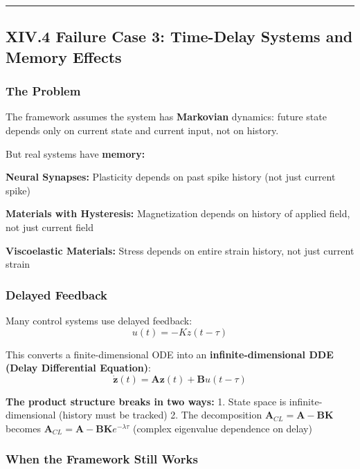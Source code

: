 \documentclass[
]{article}
\begin{document}
\begin{center}\rule{0.5\linewidth}{0.5pt}\end{center}

\subsection{XIV.4 Failure Case 3: Time-Delay Systems and Memory
Effects}\label{xiv.4-failure-case-3-time-delay-systems-and-memory-effects}

\subsubsection{The Problem}\label{the-problem-2}

The framework assumes the system has \textbf{Markovian} dynamics: future
state depends only on current state and current input, not on history.

But real systems have \textbf{memory:}

\textbf{Neural Synapses:} Plasticity depends on past spike history (not
just current spike)

\textbf{Materials with Hysteresis:} Magnetization depends on history of
applied field, not just current field

\textbf{Viscoelastic Materials:} Stress depends on entire strain
history, not just current strain

\subsubsection{Delayed Feedback}\label{delayed-feedback}

Many control systems use delayed feedback: \[u(t) = -K z(t - \tau)\]

This converts a finite-dimensional ODE into an
\textbf{infinite-dimensional DDE (Delay Differential Equation)}:
\[\dot{\mathbf{z}}(t) = \mathbf{A}\mathbf{z}(t) + \mathbf{B}u(t - \tau)\]

\textbf{The product structure breaks in two ways:} 1. State space is
infinite-dimensional (history must be tracked) 2. The decomposition
\(\mathbf{A}_{CL} = \mathbf{A} - \mathbf{BK}\) becomes
\(\mathbf{A}_{CL} = \mathbf{A} - \mathbf{BK}e^{-\lambda\tau}\) (complex
eigenvalue dependence on delay)

\subsubsection{When the Framework Still
Works}\label{when-the-framework-still-works-2}
\end{document}
